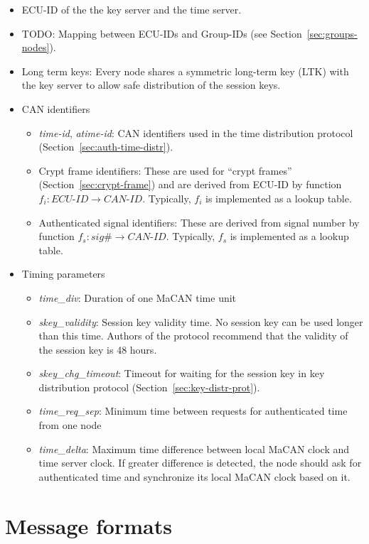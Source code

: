 \documentclass{article}
\begin{document}
\begin{itemize}
\item ECU-ID of the the key server and the time server.
\item TODO: Mapping between ECU-IDs and Group-IDs (see Section~\ref{sec:groups-nodes}).
\item Long term keys: Every node shares a symmetric long-term key (LTK) with the key server to allow safe distribution of the session keys.
\item CAN identifiers
  \begin{itemize}
  \item \emph{time-id}, \emph{atime-id}: CAN identifiers used in the time distribution protocol (Section~\ref{sec:auth-time-distr}).
  \item Crypt frame identifiers: These are used for ``crypt frames'' (Section~\ref{sec:crypt-frame}) and are derived from ECU-ID by function $f_i:ECU$-$ID \rightarrow CAN$-$ID$. Typically, $f_i$ is implemented as a lookup table.
  \item Authenticated signal identifiers: These are derived from signal number by function $f_s:sig\# \rightarrow CAN$-$ID$. Typically, $f_s$ is implemented as a lookup table.
  \end{itemize}
\item Timing parameters
  \begin{itemize}
  \item \emph{time\_div}: Duration of one MaCAN time unit
  \item \emph{skey\_validity}: Session key validity time. No session key can be used longer than this time. Authors of the protocol recommend that the validity of the session key is 48 hours.
  \item \emph{skey\_chg\_timeout}: Timeout for waiting for the session key in key distribution protocol (Section~\ref{sec:key-distr-prot}).
  \item \emph{time\_req\_sep}: Minimum time between requests for authenticated time from one node
  \item \emph{time\_delta}: Maximum time difference between local MaCAN clock and time server clock. If greater difference is detected, the node should ask for authenticated time and synchronize its local MaCAN clock based on it.
  \end{itemize}
\end{itemize}

\section{Message formats}
\label{sec:message-formats}
\end{document}
